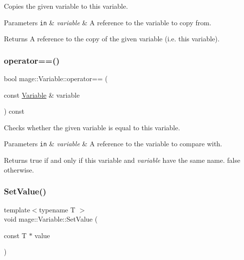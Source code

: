 Copies the given variable to this variable.


\begin{DoxyParams}[1]{Parameters}
\mbox{\tt in}  & {\em variable} & A reference to the variable to copy from. \\
\hline
\end{DoxyParams}
\begin{DoxyReturn}{Returns}
A reference to the copy of the given variable (i.\+e. this variable). 
\end{DoxyReturn}
\hypertarget{structmage_1_1_variable_a5d1f7965ca7d0e29f6879cda014e8fa9}{}\label{structmage_1_1_variable_a5d1f7965ca7d0e29f6879cda014e8fa9} 
\subsubsection{\texorpdfstring{operator==()}{operator==()}}
{\footnotesize\ttfamily bool mage\+::\+Variable\+::operator== (\begin{DoxyParamCaption}\item[{const \hyperlink{structmage_1_1_variable}{Variable} \&}]{variable }\end{DoxyParamCaption}) const}

Checks whether the given variable is equal to this variable.


\begin{DoxyParams}[1]{Parameters}
\mbox{\tt in}  & {\em variable} & A reference to the variable to compare with. \\
\hline
\end{DoxyParams}
\begin{DoxyReturn}{Returns}
{\ttfamily true} if and only if this variable and {\itshape variable} have the same name. {\ttfamily false} otherwise. 
\end{DoxyReturn}
\hypertarget{structmage_1_1_variable_afa9cfd0a42d8a15cccf7f49197648504}{}\label{structmage_1_1_variable_afa9cfd0a42d8a15cccf7f49197648504} 
\subsubsection{\texorpdfstring{Set\+Value()}{SetValue()}}
{\footnotesize\ttfamily template$<$typename T $>$ \\
void mage\+::\+Variable\+::\+Set\+Value (\begin{DoxyParamCaption}\item[{const T $\ast$}]{value }\end{DoxyParamCaption})}


